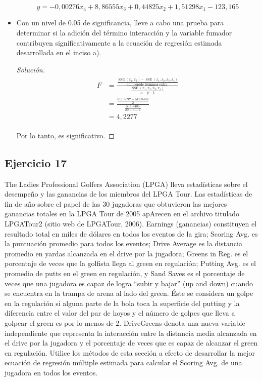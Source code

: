\documentclass[a4paper,12pt]{article}
\newenvironment{solution}
  {\renewcommand\qedsymbol{$\blacksquare$}\begin{proof}[Solución]}
  {\end{proof}}
\begin{document}
\begin{itemize}
\begin{center}
    \end{center}
    $$y=-0,00276x_4+8,86555x_3+0,44825x_2+1,51298x_1-123,165$$
    \item   Con un nivel de 0.05 de significancia, lleve a cabo una prueba para determinar si la adición del término interacción y la variable fumador contribuyen significativamente a la ecuación de regresión estimada desarrollada en el inciso a).
    \begin{solution}
    \begin{align}
\begin{aligned}
F &=\frac{\frac{\operatorname{SSE}\left(x_{1}, x_{2}\right)-\operatorname{SSE}\left(x_{1}, x_{2}, x_{3}, x_{4}\right)}{\operatorname{númbero} \text {de términos extra }}}{\frac{\operatorname{SSE}\left(x_{1}, x_{2}, x_{3}, x_{4}\right)}{n-p-1}} \\
&=\frac{\frac{811.3097-518.8406}{2}}{\frac{518.8406}{20-4-1}}\\
&= 4,2277
\end{aligned}
\end{align}

Por lo tanto, es significativo.
    \end{solution}
    
\end{itemize}

\subsection{Ejercicio 17}
The Ladies Professional Golfers Association (LPGA) lleva estadísticas sobre el desempeño y las ganancias de los miembros del LPGA Tour. Las estadísticas de fin de año sobre el papel de las 30 jugadoras que obtuvieron las mejores ganancias totales en la LPGA Tour de 2005 apArecen en el archivo titulado LPGATour2 (sitio web de LPGATour, 2006). Earnings (ganancias) constituyen el resultado total en miles de dólares en todos los eventos de la gira; Scoring Avg. es la puntuación promedio para todos los eventos; Drive Average es la distancia promedio en yardas alcanzada en el drive por la jugadora; Greens in Reg. es el porcentaje de veces que la golfista llega al green en regulación; Putting Avg. es el promedio de putts en el green en regulación, y Sand Saves es el porcentaje de veces que una jugadora es capaz de logra “subir y bajar” (up and down) cuando se encuentra en la trampa de arena al lado del green. Éste se considera un golpe en la regulación si alguna parte de la bola toca la superficie del putting y la diferencia entre el valor del par de hoyos y el número de golpes que lleva a golpear el green es por lo menos de 2. DriveGreens denota una nueva variable independiente que representa la interacción entre la distancia media alcanzada en el drive por la jugadora y el porcentaje de veces que es capaz de alcanzar el green en regulación. Utilice los métodos de esta sección a efecto de desarrollar la mejor ecuación de regresión múltiple estimada para calcular el Scoring Avg. de una jugadora en todos los eventos.
\end{document}
